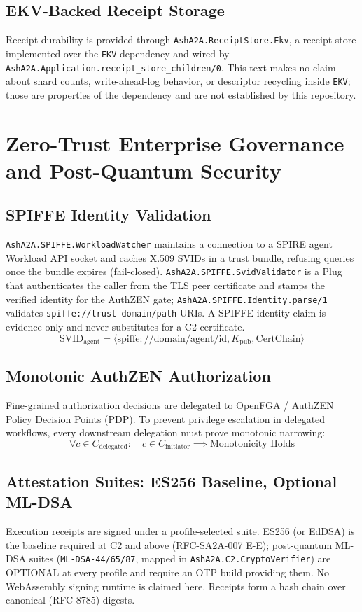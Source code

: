 \documentclass[11pt,twoside,openright]{report}
\theoremstyle{definition}
\theoremstyle{plain}
\theoremstyle{remark}
\begin{document}
\section{EKV-Backed Receipt Storage}
Receipt durability is provided through \texttt{AshA2A.ReceiptStore.Ekv}, a receipt store implemented over the \texttt{EKV} dependency and wired by \texttt{AshA2A.Application.receipt\_store\_children/0}. This text makes no claim about shard counts, write-ahead-log behavior, or descriptor recycling inside \texttt{EKV}; those are properties of the dependency and are not established by this repository.

\chapter{Zero-Trust Enterprise Governance and Post-Quantum Security}
\label{ch:enterprise}

\section{SPIFFE Identity Validation}
\texttt{AshA2A.SPIFFE.WorkloadWatcher} maintains a connection to a SPIRE agent Workload API socket and caches X.509 SVIDs in a trust bundle, refusing queries once the bundle expires (fail-closed). \texttt{AshA2A.SPIFFE.SvidValidator} is a Plug that authenticates the caller from the TLS peer certificate and stamps the verified identity for the AuthZEN gate; \texttt{AshA2A.SPIFFE.Identity.parse/1} validates \texttt{spiffe://trust-domain/path} URIs. A SPIFFE identity claim is evidence only and never substitutes for a C2 certificate.
\[
\mathrm{SVID}_{\mathrm{agent}} = \langle \mathrm{spiffe://domain/agent/id}, K_{\mathrm{pub}}, \mathrm{CertChain} \rangle
\]

\section{Monotonic AuthZEN Authorization}
Fine-grained authorization decisions are delegated to OpenFGA / AuthZEN Policy Decision Points (PDP). To prevent privilege escalation in delegated workflows, every downstream delegation must prove monotonic narrowing:
\[
\forall c \in C_{\mathrm{delegated}}: \quad c \in C_{\mathrm{initiator}} \implies \text{Monotonicity Holds}
\]

\section{Attestation Suites: ES256 Baseline, Optional ML-DSA}
Execution receipts are signed under a profile-selected suite. ES256 (or EdDSA) is the baseline required at C2 and above (RFC-SA2A-007 E-E); post-quantum ML-DSA suites (\texttt{ML-DSA-44/65/87}, mapped in \texttt{AshA2A.C2.CryptoVerifier}) are OPTIONAL at every profile and require an OTP build providing them. No WebAssembly signing runtime is claimed here. Receipts form a hash chain over canonical (RFC 8785) digests.
\end{document}
